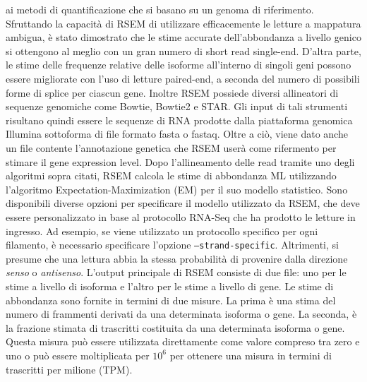 ai metodi di quantificazione che si basano su un genoma di riferimento. Sfruttando la capacità di RSEM di
utilizzare efficacemente le letture a mappatura ambigua, è stato dimostrato che le stime accurate dell'abbondanza a
livello genico si ottengono al meglio con un gran numero di short read single-end. D'altra parte, le stime delle
frequenze relative delle isoforme all'interno di singoli geni possono essere migliorate con l'uso di letture 
paired-end, a seconda del numero di possibili forme di splice per ciascun gene. Inoltre RSEM possiede diversi
allineatori di sequenze genomiche come Bowtie, Bowtie2 e STAR. Gli input di tali strumenti risultano quindi essere le
sequenze di RNA prodotte dalla piattaforma genomica Illumina sottoforma di file formato fasta o fastaq. Oltre a ciò,
viene dato anche un file contente l'annotazione genetica che RSEM userà come rifermento per stimare il gene expression 
level. 
Dopo l'allineamento delle read tramite uno degli algoritmi sopra citati, RSEM calcola le stime di abbondanza ML
utilizzando l'algoritmo Expectation-Maximization (EM) per il suo modello statistico. Sono disponibili diverse opzioni
per specificare il modello utilizzato da RSEM, che deve essere personalizzato in base al protocollo RNA-Seq che ha
prodotto le letture in ingresso. Ad esempio, se viene utilizzato un protocollo specifico per ogni filamento, è
necessario specificare l'opzione \texttt{--strand-specific}. Altrimenti, si presume che una lettura abbia la stessa
probabilità di provenire dalla direzione \textit{senso} o \textit{antisenso}. L'output principale di RSEM consiste 
di due file: uno per le stime a livello di isoforma e l'altro per le stime a livello di gene. 
Le stime di abbondanza sono fornite in termini di due misure. La prima è una stima del numero di frammenti derivati 
da una determinata isoforma o gene. La seconda, è la frazione stimata di trascritti costituita da una determinata
isoforma o gene. Questa misura può essere utilizzata direttamente come valore compreso tra zero e uno o può essere
moltiplicata per $10^6$ per ottenere una misura in termini di trascritti per milione (TPM). 

